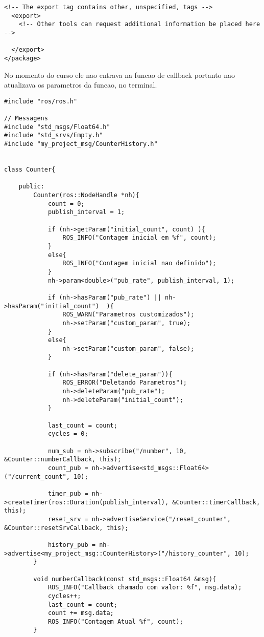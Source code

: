 \documentclass[letterpaper]{article}
\begin{document}
\begin{lstlisting}[style=xmlstyle, title=src/my\_project\_cpp/package.xml]
  <!-- The export tag contains other, unspecified, tags -->
  <export>
    <!-- Other tools can request additional information be placed here -->

  </export>
</package>

\end{lstlisting}
No momento do curso ele nao entrava na funcao de callback portanto nao atualizava os parametros da funcao, no terminal.
\begin{lstlisting}[style=cppstyle, title=src/my\_project\_cpp/src/counter.cpp] 
#include "ros/ros.h"

// Messagens
#include "std_msgs/Float64.h"
#include "std_srvs/Empty.h"
#include "my_project_msg/CounterHistory.h"


class Counter{

    public:
        Counter(ros::NodeHandle *nh){
            count = 0;
            publish_interval = 1;

            if (nh->getParam("initial_count", count) ){
                ROS_INFO("Contagem inicial em %f", count);
            }
            else{
                ROS_INFO("Contagem inicial nao definido");
            }   
            nh->param<double>("pub_rate", publish_interval, 1);

            if (nh->hasParam("pub_rate") || nh->hasParam("initial_count")  ){
                ROS_WARN("Parametros customizados");
                nh->setParam("custom_param", true);
            }
            else{
                nh->setParam("custom_param", false);
            }

            if (nh->hasParam("delete_param")){
                ROS_ERROR("Deletando Parametros");
                nh->deleteParam("pub_rate");
                nh->deleteParam("initial_count");
            }

            last_count = count;
            cycles = 0;

            num_sub = nh->subscribe("/number", 10, &Counter::numberCallback, this);
            count_pub = nh->advertise<std_msgs::Float64>("/current_count", 10);

            timer_pub = nh->createTimer(ros::Duration(publish_interval), &Counter::timerCallback, this);
            reset_srv = nh->advertiseService("/reset_counter", &Counter::resetSrvCallback, this);

            history_pub = nh->advertise<my_project_msg::CounterHistory>("/history_counter", 10);
        }

        void numberCallback(const std_msgs::Float64 &msg){
            ROS_INFO("Callback chamado com valor: %f", msg.data);
            cycles++;
            last_count = count;
            count += msg.data;
            ROS_INFO("Contagem Atual %f", count);
        }


\end{lstlisting}
\end{document}
